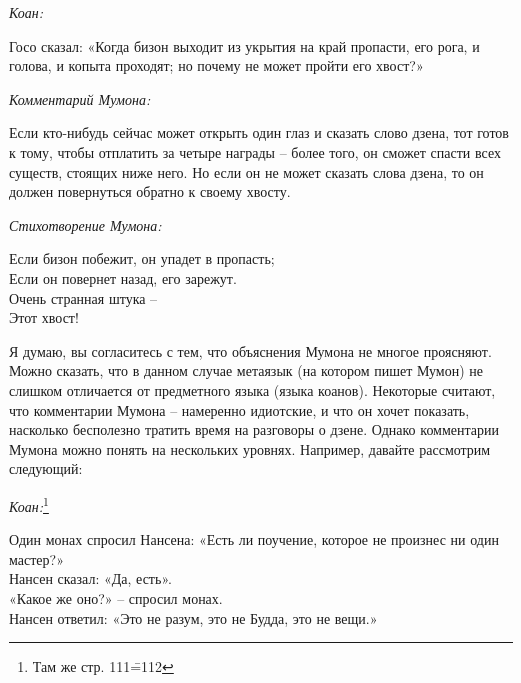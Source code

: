\documentclass[../main.tex]{subfiles}
\begin{document}
\begin{koan}
    \emph{\normalsize Коан:}
    \vspace{2pt}

    Госо сказал: «Когда бизон выходит из укрытия на край пропасти, его рога, и голова, и копыта проходят; но почему не может пройти его хвост?»
\end{koan}

\begin{koan}
    \emph{\normalsize Комментарий Мумона:}
    \vspace{2pt}

    Если кто-нибудь сейчас может открыть один глаз и сказать слово дзена, тот готов к тому, чтобы отплатить за четыре награды \--- более того, он сможет спасти всех существ, стоящих ниже него. Но если он не может сказать слова дзена, то он должен повернуться обратно к своему хвосту.
\end{koan}

\begin{koan}
    \emph{\normalsize Стихотворение Мумона:}

    \begin{mumonverse}
        Если бизон побежит, он упадет в пропасть; \\
        Если он повернет назад, его зарежут. \\
        Очень странная штука \--- \\
        Этот хвост!
    \end{mumonverse}
\end{koan}

Я думаю, вы согласитесь с тем, что объяснения Мумона не многое проясняют. Можно сказать, что в данном случае метаязык (на котором пишет Мумон) не слишком отличается от предметного языка (языка коанов). Некоторые считают, что комментарии Мумона \--- намеренно идиотские, и что он хочет показать, насколько бесполезно тратить время на разговоры о дзене. Однако комментарии Мумона можно понять на нескольких уровнях. Например, давайте рассмотрим следующий:

\begin{koan}
    \emph{\normalsize Коан:}\footnote{Там же стр. 111\==112}
    \vspace{2pt}

    Один монах спросил Нансена: «Есть ли поучение, которое не произнес ни один мастер?» \\
    Нансен сказал: «Да, есть». \\
    «Какое же оно?» \--- спросил монах. \\
    Нансен ответил: «Это не разум, это не Будда, это не вещи.»
\end{koan}
\end{document}
